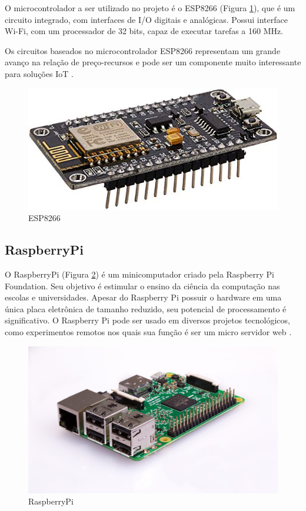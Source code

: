 \newpage

O microcontrolador a ser utilizado no projeto é o ESP8266 (Figura \ref{fig:esp}), que é um circuito integrado, com interfaces de I/O digitais e analógicas. Possui interface Wi-Fi, com um processador de 32 bits, capaz de executar tarefas a 160 MHz.

Os circuitos baseados no microcontrolador ESP8266 representam um grande avanço na relação de preço-recursos e pode ser um componente muito interessante para soluções IoT \cite {de2017internet}.

\begin{figure}[htbp]
		\centering
		\includegraphics[scale=0.5]{figuras/esp8266_.jpg}
		\caption{ESP8266}
		\label{fig:esp}
\end{figure}


\subsection{RaspberryPi}

O RaspberryPi (Figura \ref{fig:rpi}) é um minicomputador criado pela Raspberry Pi Foundation. Seu objetivo é estimular o ensino da ciência da computação nas escolas e universidades. Apesar do Raspberry Pi possuir o hardware em uma única placa eletrônica de tamanho reduzido, seu potencial de processamento é significativo. O Raspberry Pi pode ser usado em diversos projetos tecnológicos, como experimentos remotos nos quais sua função é ser um micro servidor web \cite{crotti2013raspberrypi}.

\begin{figure}[htbp]
		\centering
		\includegraphics[scale=0.2]{figuras/raspberrypi.jpg}
		\caption{RaspberryPi}
		\label{fig:rpi}
\end{figure}

